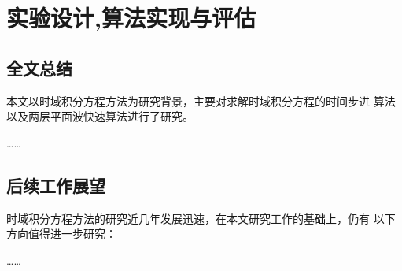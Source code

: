 
\chapter{实验设计,算法实现与评估}
\label{chapter:experiment}
\section{全文总结}
本文以时域积分方程方法为研究背景，主要对求解时域积分方程的时间步进
算法以及两层平面波快速算法进行了研究。

……
\section{后续工作展望}
时域积分方程方法的研究近几年发展迅速，在本文研究工作的基础上，仍有
以下方向值得进一步研究：

……
